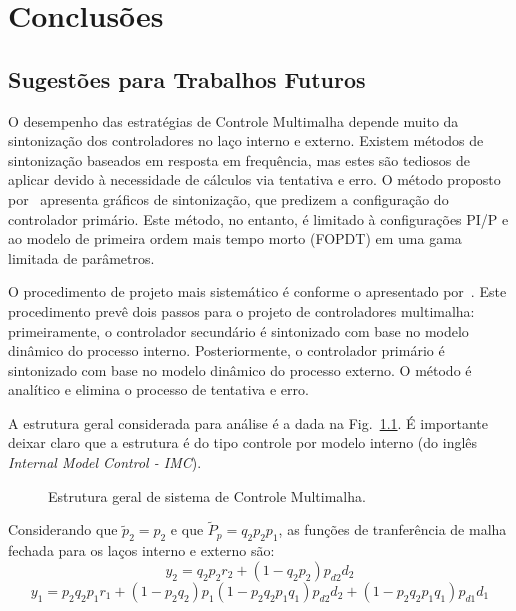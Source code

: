 
\chapter{Conclusões}\label{conclusoes}


\section{Sugestões para Trabalhos Futuros}

  O desempenho das estratégias de Controle Multimalha depende muito da sintonização dos controladores no laço interno e externo. Existem métodos de sintonização baseados em resposta em frequência, mas estes são tediosos de aplicar devido à necessidade de cálculos via tentativa e erro. O método proposto por~\cite{ref:KRISHNA} apresenta gráficos de sintonização, que predizem a configuração do controlador primário. Este método, no entanto, é limitado à configurações PI/P e ao modelo de primeira ordem mais tempo morto (FOPDT) em uma gama limitada de parâmetros.

  O procedimento de projeto mais sistemático é conforme o apresentado por~\cite{ref:LEE}. Este procedimento prevê dois passos para o projeto de controladores multimalha: primeiramente, o controlador secundário é sintonizado com base no modelo dinâmico do processo interno. Posteriormente, o controlador primário é sintonizado com base no modelo dinâmico do processo externo. O método é analítico e elimina o processo de tentativa e erro.

  A estrutura geral considerada para análise é a dada na
  Fig.~\ref{fig:multiloop_lee}. É importante deixar claro que a estrutura é do tipo controle por modelo interno (do inglês \emph{Internal Model Control - IMC}).
  \begin{figure}[htb]
    \centering
      \def\svgwidth{\textwidth}
      
    \renewcommand\figurename{Fig.}
    \caption{Estrutura geral de sistema de Controle Multimalha.}
    \label{fig:multiloop_lee}
  \end{figure}

  Considerando que $\tilde{p}_2 = p_2$ e que $\tilde{P}_p = q_2 p_2 p_1$, as funções de tranferência de malha fechada para os laços interno e externo são:
  \begin{equation}
    y_2 = q_2 p_2 r_2 + \left( 1- q_2 p_2 \right) p_{d2} d_2
  \end{equation}
  \begin{equation}
    y_1 = p_2 q_2 p_1 r_1 + \left( 1 - p_2 q_2 \right) p_1 \left(
      1 - p_2 q_2 p_1 q_1 \right) p_{d2} d_2 + \left( 1 - p_2 q_2 p_1 q_1
      \right) p_{d1} d_1
  \end{equation}

